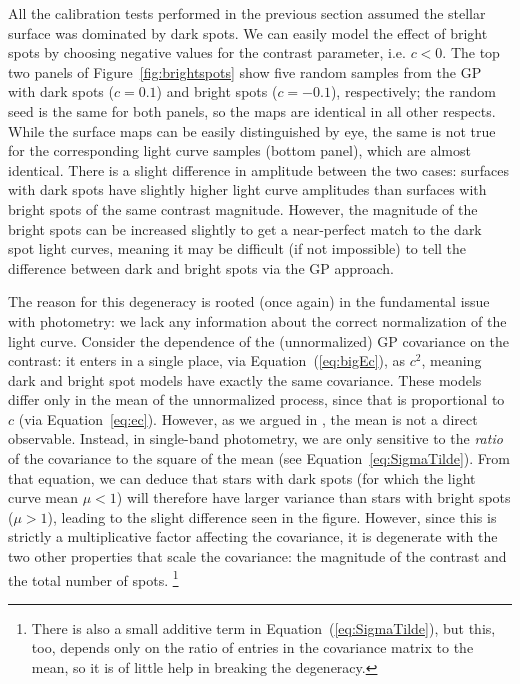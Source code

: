 \documentclass[modern,linenumbers]{aastex62}
\begin{document}
All the calibration tests performed in the previous section assumed the
stellar surface was dominated by dark spots. We can easily model the
effect of bright spots by choosing negative values for the contrast
parameter, i.e. $c < 0$. The top two panels of Figure~\ref{fig:brightspots}
show five random samples from the GP with dark spots ($c = 0.1$) and
bright spots ($c = -0.1$), respectively; the random seed is the same for
both panels, so the maps are identical in all other respects.
While the surface maps can be easily distinguished by eye, the same is not
true for the corresponding light curve samples (bottom panel), which
are almost identical. There is a slight difference in amplitude between
the two cases: surfaces with dark spots have slightly higher light curve
amplitudes than surfaces with bright spots of the same contrast magnitude.
However, the magnitude of the bright spots can be increased slightly to get
a near-perfect match to the dark spot light curves, meaning it may be
difficult (if not impossible) to tell the difference between dark and bright
spots via the GP approach.

The reason for this degeneracy is rooted (once again) in the
fundamental issue with photometry: we lack any information about
the correct normalization of the light curve.
Consider the dependence of the (unnormalized) GP covariance on the
contrast: it enters in a single place, via Equation~(\ref{eq:bigEc}),
as $c^2$, meaning dark and bright spot models have exactly the same
covariance. These models differ only in the mean of the unnormalized
process, since that is proportional to $c$ (via Equation~\ref{eq:ec}).
However, as we argued in , the mean is not a direct
observable. Instead, in single-band photometry, we are only sensitive to
the \emph{ratio} of the covariance to the square of the mean
(see Equation~\ref{eq:SigmaTilde}). From that equation, we can deduce
that stars with dark spots (for which
the light curve mean $\mu < 1$) will therefore have larger variance
than stars with bright spots ($\mu > 1$), leading to the slight difference
seen in the figure. However, since this is strictly a multiplicative
factor affecting the covariance, it is degenerate with the two other
properties that scale the covariance: the magnitude of the contrast and
the total number of spots.%
\footnote{There is also a small additive term in
    Equation~(\ref{eq:SigmaTilde}), but this, too, depends only on the ratio
    of entries in the covariance matrix to the mean, so it is of little help
    in breaking the degeneracy.}
\end{document}
